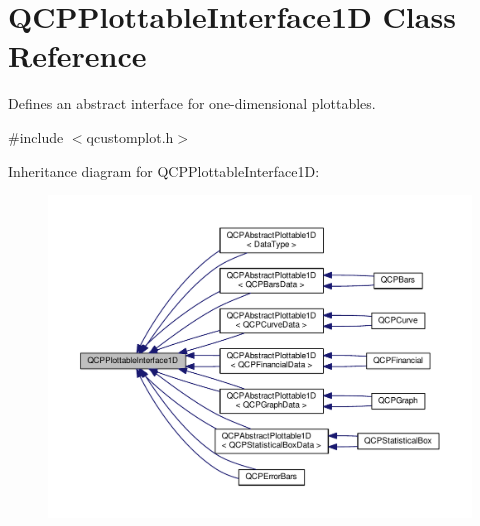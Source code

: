 \hypertarget{class_q_c_p_plottable_interface1_d}{}\section{Q\+C\+P\+Plottable\+Interface1D Class Reference}
\label{class_q_c_p_plottable_interface1_d}


Defines an abstract interface for one-\/dimensional plottables.  




{\ttfamily \#include $<$qcustomplot.\+h$>$}



Inheritance diagram for Q\+C\+P\+Plottable\+Interface1D\+:\nopagebreak
\begin{figure}[H]
\begin{center}
\leavevmode
\includegraphics[width=350pt]{class_q_c_p_plottable_interface1_d__inherit__graph}
\end{center}
\end{figure}
